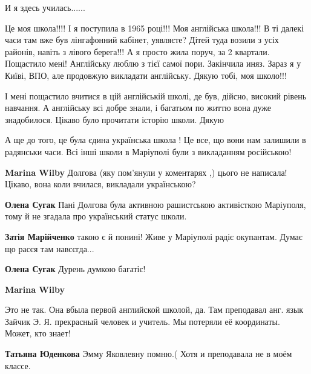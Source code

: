 
И я здесь училась......


Це моя школа!!!! І я поступила в 1965 році!!! Моя англійська школа!!! В ті
далекі часи там вже був лінгафонний кабінет, уявляєте? Дітей туда возили з усіх
районів, навіть з лівого берега!!! А я просто жила поруч, за 2 квартали.
Пощастило мені! Англійську люблю з тієї самої пори. Закінчила иняз. Зараз я у
Київі, ВПО, але продовжую викладати англійську. Дякую тобі, моя школо!!!


І мені пощастило вчитися в цій англійській школі, де був, дійсно, високий
рівень навчання. А англійську всі добре знали, і багатьом по життю вона дуже
знадобилося. Цікаво було прочитати історію школи. Дякую


А ще до того, це була єдина українська школа ! Це все, що вони нам залишили в
радянськи часи. Всі інші школи в Маріуполі були з викладанням російською!

\begin{itemize} %
\textbf{Marina Wilby} Долгова (яку пом'янули у коментарях ,) цього не написала! Цікаво, вона коли вчилася, викладали українською?

\begin{itemize} %
\textbf{Олена Сугак} Пані Долгова була активною рашистською активісткою Маріуполя, тому й не згадала про український статус школи.

\textbf{Затія Марійченко} такою є й понині! Живе у Маріуполі радіє окупантам. Думає що расєя там навсєгда...

\textbf{Олена Сугак} Дурень думкою багатіє!
\end{itemize} %

\textbf{Marina Wilby} 

Это не так. Она вбыла первой английской школой, да. Там преподавал анг. язык
Зайчик Э. Я. прекрасный человек и учитель. Мы потеряли её координаты. Может, кто
знает!

\begin{itemize} %
\textbf{Татьяна Юденкова} Эмму Яковлевну помню.( Хотя и преподавала не в моём классе.
\end{itemize} %

\end{itemize} %

